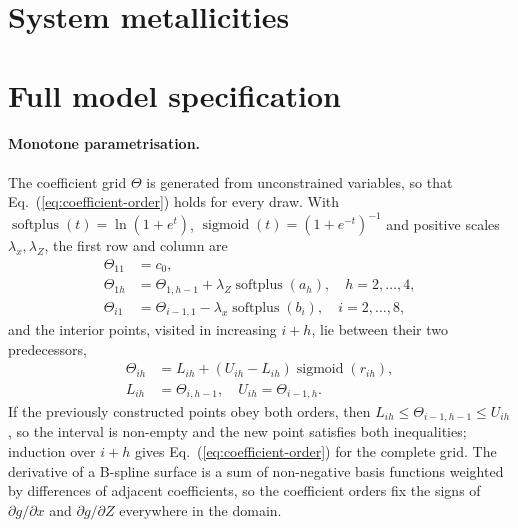 \documentclass{aa}
\newcommand{\softplus}{\operatorname{softplus}}
\newcommand{\sigmoid}{\operatorname{sigmoid}}
\begin{document}
\begin{acknowledgements}
\end{acknowledgements}




\begin{appendix}

\section{System metallicities}

\section{Full model specification}\label{app:model}
\paragraph{Monotone parametrisation.} The coefficient grid $\Theta$ is generated from unconstrained variables, so that Eq.~(\ref{eq:coefficient-order}) holds for every draw. With $\softplus(t)=\ln(1+e^t)$, $\sigmoid(t)=(1+e^{-t})^{-1}$ and positive scales $\lambda_x,\lambda_Z$, the first row and column are
\begin{align}
 \Theta_{11}&=c_0,\\
 \Theta_{1h}&=\Theta_{1,h-1}+\lambda_Z\softplus(a_h),\quad h=2,\ldots,4,\\
 \Theta_{i1}&=\Theta_{i-1,1}-\lambda_x\softplus(b_i),\quad i=2,\ldots,8,
\end{align}
and the interior points, visited in increasing $i+h$, lie between their two predecessors,
\begin{align}
 \Theta_{ih}&=L_{ih}+(U_{ih}-L_{ih})\sigmoid(r_{ih}),\\
 L_{ih}&=\Theta_{i,h-1},\quad U_{ih}=\Theta_{i-1,h}.
\end{align}
If the previously constructed points obey both orders, then $L_{ih}\le\Theta_{i-1,h-1}\le U_{ih}$, so the interval is non-empty and the new point satisfies both inequalities; induction over $i+h$ gives Eq.~(\ref{eq:coefficient-order}) for the complete grid. The derivative of a B-spline surface is a sum of non-negative basis functions weighted by differences of adjacent coefficients, so the coefficient orders fix the signs of $\partial g/\partial x$ and $\partial g/\partial Z$ everywhere in the domain.


\end{appendix}
\end{document}
